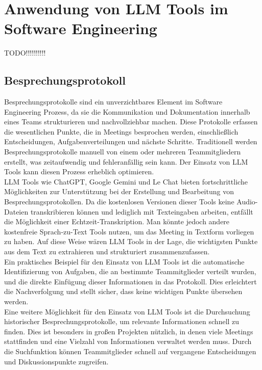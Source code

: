 
\chapter{Anwendung von LLM Tools im Software Engineering} 

TODO!!!!!!!!!!

\section{Besprechungsprotokoll}  \label{Besprechungsprotokoll}

Besprechungsprotokolle sind ein unverzichtbares Element im Software Engineering Prozess, da sie die Kommunikation 
und Dokumentation innerhalb eines Teams strukturieren und nachvollziehbar machen. Diese Protokolle erfassen die 
wesentlichen Punkte, die in Meetings besprochen werden, einschließlich Entscheidungen, Aufgabenverteilungen und 
nächste Schritte. Traditionell werden Besprechungsprotokolle manuell von einem oder mehreren Teammitgliedern erstellt, 
was zeitaufwendig und fehleranfällig sein kann. Der Einsatz von LLM Tools kann diesen Prozess erheblich optimieren.\\

LLM Tools wie ChatGPT, Google Gemini und Le Chat bieten fortschrittliche Möglichkeiten zur Unterstützung bei der Erstellung 
und Bearbeitung von Besprechungsprotokollen. Da die kostenlosen Versionen dieser Tools keine Audio-Dateien transkribieren 
können und lediglich mit Texteingaben arbeiten, entfällt die Möglichkeit einer Echtzeit-Transkription. Man könnte jedoch 
andere kostenfreie Sprach-zu-Text Tools nutzen, um das Meeting in Textform vorliegen zu haben. Auf diese Weise wären LLM 
Tools in der Lage, die wichtigsten Punkte aus dem Text zu extrahieren und strukturiert zusammenzufassen.\\

Ein praktisches Beispiel für den Einsatz von LLM Tools ist die automatische Identifizierung von Aufgaben, die an bestimmte 
Teammitglieder verteilt wurden, und die direkte Einfügung dieser Informationen in das Protokoll. Dies erleichtert die 
Nachverfolgung und stellt sicher, dass keine wichtigen Punkte übersehen werden.\\

Eine weitere Möglichkeit für den Einsatz von LLM Tools ist die Durchsuchung historischer Besprechungsprotokolle, um relevante 
Informationen schnell zu finden. Dies ist besonders in großen Projekten nützlich, in denen viele Meetings stattfinden und eine
Vielzahl von Informationen verwaltet werden muss. Durch die Suchfunktion können Teammitglieder schnell auf vergangene 
Entscheidungen und Diskussionspunkte zugreifen.

